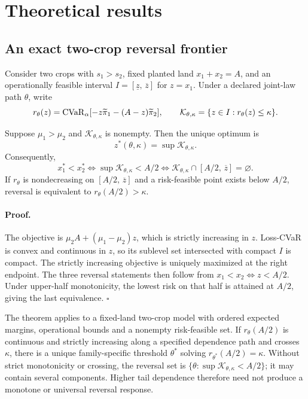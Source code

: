 \section{Theoretical results}

\subsection{An exact two-crop reversal frontier}

Consider two crops with \(s_1>s_2\), fixed planted land
\(x_1+x_2=A\), and an operationally feasible interval
\(I=[\underline z,\,\overline z]\) for \(z=x_1\). Under a declared
joint-law path \(\theta\), write
\[
r_\theta(z)=\operatorname{CVaR}_\alpha[-z\widetilde\pi_1-(A-z)\widetilde\pi_2],
\qquad
\mathcal K_{\theta,\kappa}=\{z\in I:r_\theta(z)\le\kappa\}.
\]

\begin{theorem}
\label{thm:frontier}
Suppose \(\mu_1>\mu_2\) and \(\mathcal K_{\theta,\kappa}\) is nonempty.
Then the unique optimum is
\[
z^*(\theta,\kappa)=\sup\mathcal K_{\theta,\kappa}.
\]
Consequently,
\[
x_1^*<x_2^*
\Longleftrightarrow
\sup\mathcal K_{\theta,\kappa}<A/2
\Longleftrightarrow
\mathcal K_{\theta,\kappa}\cap[A/2,\,\overline z]=\varnothing .
\]
If \(r_\theta\) is nondecreasing on
\([A/2,\,\overline z]\) and a risk-feasible point exists below \(A/2\),
reversal is equivalent to \(r_\theta(A/2)>\kappa\).
\end{theorem}

\paragraph{Proof.}
The objective is
\(\mu_2A+(\mu_1-\mu_2)z\), which is strictly increasing in \(z\).
Loss-CVaR is convex and continuous in \(z\), so its sublevel set intersected
with compact \(I\) is compact. The strictly increasing objective is uniquely
maximized at the right endpoint. The three reversal statements then follow
from \(x_1<x_2\Longleftrightarrow z<A/2\). Under upper-half monotonicity,
the lowest risk on that half is attained at \(A/2\), giving the last
equivalence. \(\square\)

The theorem applies to a fixed-land two-crop model with ordered expected
margins, operational bounds and a nonempty risk-feasible set. If
\(r_\theta(A/2)\) is continuous and strictly increasing along a specified
dependence path and crosses \(\kappa\), there is a unique family-specific
threshold \(\theta^*\) solving
\(r_{\theta^*}(A/2)=\kappa\). Without strict monotonicity or crossing, the
reversal set is
\(\{\theta:\sup\mathcal K_{\theta,\kappa}<A/2\}\); it may contain several
components. Higher tail dependence therefore need not produce a monotone or
universal reversal response.

